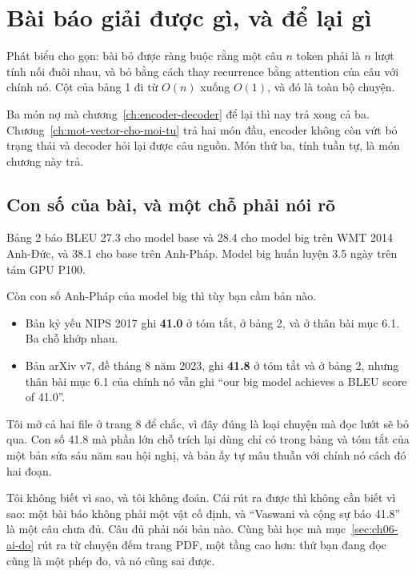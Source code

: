 \section{Bài báo giải được gì, và để lại gì}
\label{sec:ch07-con-lai-gi}

%
Phát biểu cho gọn: bài bỏ được ràng buộc rằng một câu \(n\) token phải là \(n\)
lượt tính nối đuôi nhau, và bỏ bằng cách thay recurrence bằng attention của câu
với chính nó. Cột  của bảng 1 đi từ \(O(n)\) xuống \(O(1)\), và
đó là toàn bộ chuyện.

Ba món nợ mà chương~\ref{ch:encoder-decoder} để lại thì nay trả xong cả ba.
Chương~\ref{ch:mot-vector-cho-moi-tu} trả hai món đầu, encoder không còn vứt bỏ
trạng thái và decoder hỏi lại được câu nguồn. Món thứ ba, tính tuần tự, là món
chương này trả.

\subsection*{Con số của bài, và một chỗ phải nói rõ}

%
Bảng 2 báo BLEU 27.3 cho model base và 28.4 cho model big trên WMT 2014
Anh-Đức, và 38.1 cho base trên Anh-Pháp. Model big huấn luyện 3.5 ngày trên tám
GPU P100.

Còn con số Anh-Pháp của model big thì tùy bạn cầm bản nào.

\begin{itemize}
  \item Bản kỷ yếu NIPS 2017 ghi \textbf{41.0} ở tóm tắt, ở bảng 2, và ở thân
    bài mục 6.1. Ba chỗ khớp nhau.
  \item Bản arXiv v7, đề tháng 8 năm 2023, ghi \textbf{41.8} ở tóm tắt và ở
    bảng 2, nhưng thân bài mục 6.1 của chính nó vẫn ghi \enquote{our big model
    achieves a BLEU score of 41.0}.
\end{itemize}

Tôi mở cả hai file ở trang 8 để chắc, vì đây đúng là loại chuyện mà đọc lướt sẽ
bỏ qua. Con số 41.8 mà phần lớn chỗ trích lại dùng chỉ có trong bảng và tóm tắt
của một bản sửa sáu năm sau hội nghị, và bản ấy tự mâu thuẫn với chính nó cách
đó hai đoạn.

Tôi không biết vì sao, và tôi không đoán. Cái rút ra được thì không cần biết vì
sao: một bài báo không phải một vật cố định, và \enquote{Vaswani và cộng sự báo
41.8} là một câu chưa đủ. Câu đủ phải nói bản nào. Cùng bài học mà
mục~\ref{sec:ch06-ai-do} rút ra từ chuyện đếm trang PDF, một tầng cao hơn: thứ
bạn đang đọc cũng là một phép đo, và nó cũng sai được.

